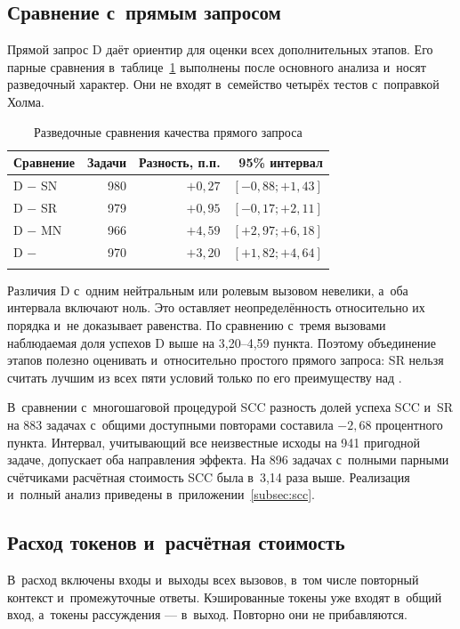 \subsection{Сравнение с~прямым запросом}
Прямой запрос D даёт ориентир для оценки всех дополнительных этапов. Его парные сравнения в~таблице~\ref{tab:direct} выполнены после основного анализа и~носят разведочный характер. Они не входят в~семейство четырёх тестов с~поправкой Холма.

\begin{table}[htbp]
\caption{Разведочные сравнения качества прямого запроса}
\label{tab:direct}
\centering\small
\begin{tabular}{@{}lrrr@{}}
\toprule
Сравнение & Задачи & Разность, п.п. & 95\% интервал \\
\midrule
D $-$ SN & 980 & $+0{,}27$ & $[-0{,}88;+1{,}43]$ \\
D $-$ SR & 979 & $+0{,}95$ & $[-0{,}17;+2{,}11]$ \\
D $-$ MN & 966 & $+4{,}59$ & $[+2{,}97;+6{,}18]$ \\
D $-$ \MultiCallRole{} & 970 & $+3{,}20$ & $[+1{,}82;+4{,}64]$ \\
\botrule
\end{tabular}
\end{table}
\FloatBarrier

Различия D с~одним нейтральным или ролевым вызовом невелики, а~оба интервала включают ноль. Это оставляет неопределённость относительно их порядка и~не доказывает равенства. По сравнению с~тремя вызовами наблюдаемая доля успехов D выше на 3,20--4,59 пункта. Поэтому объединение этапов полезно оценивать и~относительно простого прямого запроса: SR нельзя считать лучшим из всех пяти условий только по его преимуществу над \MultiCallRole{}.

В~сравнении с~многошаговой процедурой SCC разность долей успеха SCC и~SR на 883 задачах с~общими доступными повторами составила $-2{,}68$ процентного пункта. Интервал, учитывающий все неизвестные исходы на 941 пригодной задаче, допускает оба направления эффекта. На 896 задачах с~полными парными счётчиками расчётная стоимость SCC была в~3,14 раза выше. Реализация и~полный анализ приведены в~приложении~\ref{subsec:scc}.

\subsection{Расход токенов и~расчётная стоимость}
В~расход включены входы и~выходы всех вызовов, в~том числе повторный контекст и~промежуточные ответы. Кэшированные токены уже входят в~общий вход, а~токены рассуждения --- в~выход. Повторно они не прибавляются.

